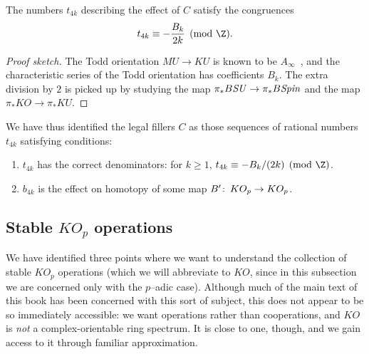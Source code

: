 \begin{corollary}
The numbers \(t_{4k}\) describing the effect of \(C\) satisfy the congruences \[t_{4k} \equiv -\frac{B_k}{2k} \pmod{\Z}.\]
\end{corollary}
\begin{proof}[Proof sketch]
The Todd orientation \(MU \to KU\) is known to be \(A_\infty\)~\cite[Theorem V.4.1]{EKMM}, and the characteristic series of the Todd orientation has coefficients \(B_k\).  The extra division by \(2\) is picked up by studying the map \(\pi_* B\mathit{SU} \to \pi_* B\mathit{Spin}\) and the map \(\pi_* KO \to \pi_* KU\).
\end{proof}

We have thus identified the legal fillers \(C\) as those sequences of rational numbers \(t_{4k}\) satisfying conditions:
\begin{enumerate}
    \item \(t_{4k}\) has the correct denominators: for \(k \ge 1\), \(t_{4k} \equiv -B_k/(2k) \pmod{\Z}\).
    \item \(b_{4k}\) is the effect on homotopy of some map \(B'\colon\thinspace KO_p \to KO_p\).
\end{enumerate}


\subsection{Stable \(KO_p\) operations}

We have identified three points where we want to understand the collection of stable \(KO_p\) operations (which we will abbreviate to \(KO\), since in this subsection we are concerned only with the \(p\)--adic case).  Although much of the main text of this book has been concerned with this sort of subject, this does not appear to be so immediately accessible: we want operations rather than cooperations, and \(KO\) is \emph{not} a complex-orientable ring spectrum.  It is close to one, though, and we gain access to it through familiar approximation.

